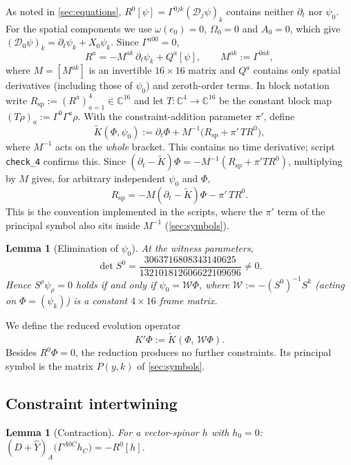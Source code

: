 \documentclass[11pt]{article}
\theoremstyle{plain}
\newtheorem{lemma}[theorem]{Lemma}
\theoremstyle{definition}
\theoremstyle{remark}
\newcommand{\C}{\mathbb{C}}
\newcommand{\Dcal}{\mathcal{D}}
\newcommand{\Wcal}{\mathcal{W}}
\begin{document}
As noted in \cref{sec:equations}, $R^0[\psi] = \Gamma^{0jk}(\Dcal_j\psi)_k$ contains neither $\partial_t$ nor $\psi_0$. For the spatial components we use $\omega(e_0) = 0$, $\Omega_0 = 0$ and $A_0 = 0$, which give $(\Dcal_0\psi)_k = \partial_t\psi_k + X_0\psi_k$. Since $\Gamma^{a00} = 0$,
\[
  R^a = -M^{ak}\,\partial_t\psi_k + Q^a[\psi],\qquad M^{ak} := \Gamma^{0ak},
\]
where $M = [M^{ak}]$ is an invertible $16\times16$ matrix and $Q^a$ contains only spatial derivatives (including those of $\psi_0$) and zeroth-order terms. In block notation write $R_{\mathrm{sp}} := (R^a)_{a=1}^4 \in \C^{16}$ and let $T\colon\C^4 \to \C^{16}$ be the constant block map $(T\rho)_a := \Gamma^0\Gamma^a\rho$. With the constraint-addition parameter $\pi'$, define
\[
  \tilde K(\Phi,\psi_0) := \partial_t\Phi + M^{-1}\bigl(R_{\mathrm{sp}} + \pi'\,TR^0\bigr),
\]
where $M^{-1}$ acts on the \emph{whole} bracket. This contains no time derivative; script \texttt{check\_4} confirms this. Since $(\partial_t - \tilde K)\Phi = -M^{-1}(R_{\mathrm{sp}} + \pi' TR^0)$, multiplying by $M$ gives, for arbitrary independent $\psi_0$ and $\Phi$,
\begin{equation}\label{eq:D}
  R_{\mathrm{sp}} = -M(\partial_t - \tilde K)\Phi - \pi'\,TR^0 .
\end{equation}
This is the convention implemented in the scripts, where the $\pi'$ term of the principal symbol also sits inside $M^{-1}$ (\cref{sec:symbols}).

\begin{lemma}[Elimination of $\psi_0$]\label{lem:elim}
At the witness parameters,
\[
  \det S^0 = \frac{3063716808343140625}{132101812606622109696} \neq 0 .
\]
Hence $S^\rho\psi_\rho = 0$ holds if and only if $\psi_0 = \Wcal\Phi$, where $\Wcal := -(S^0)^{-1}S^k$ (acting on $\Phi = (\psi_k)$) is a constant $4\times16$ frame matrix.
\end{lemma}

We define the reduced evolution operator
\[
  K'\Phi := \tilde K(\Phi,\,\Wcal\Phi).
\]
Besides $R^0\Phi = 0$, the reduction produces no further constraints. Its principal symbol is the matrix $P(y,k)$ of \cref{sec:symbols}.

\subsection{Constraint intertwining}\label{sec:ci}

\begin{lemma}[Contraction]\label{lem:contraction}
For a vector-spinor $h$ with $h_0 = 0$: $(D+\hat Y)_A\bigl(\Gamma^{A0C}h_C\bigr) = -R^0[h]$.
\end{lemma}
\end{document}
